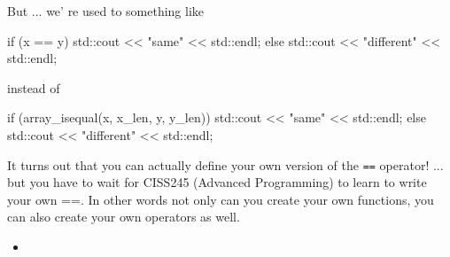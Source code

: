 But ... we' re used to something like

\begin{consolethree}[escapeinside=||]
if (x == y)
{
    std::cout << "same" << std::endl;
}
else
{
    std::cout << "different" << std::endl;
}
\end{consolethree}

instead of

\begin{consolethree}[escapeinside=||]
if (array_isequal(x, x_len, y, y_len))
{
    std::cout << "same" << std::endl;
}
else
{
    std::cout << "different" << std::endl;
}
\end{consolethree}

It turns out that you can actually define your own version of the \texttt{==} operator! ... but you have to wait for CISS245 (Advanced Programming) to learn to write your own ==. In other words not only can you create your own functions, you can also create your own operators as well.

\begin{itemize}

\item
\end{itemize}


